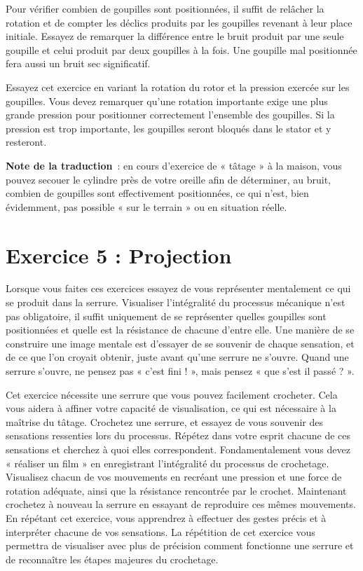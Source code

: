 \documentclass[a4paper,french,11pt,twoside]{report}
\begin{document}
Pour vérifier combien de goupilles sont positionnées, il suffit de relâcher la rotation et de compter les déclics produits par les goupilles revenant à leur place initiale. Essayez de remarquer la différence entre le bruit produit par une seule goupille et celui produit par deux goupilles à la fois. Une goupille mal positionnée fera aussi un bruit sec significatif.

Essayez cet exercice en variant la rotation du rotor et la pression exercée sur les goupilles. Vous devez remarquer qu'une rotation importante exige une plus grande pression pour positionner correctement l'ensemble des goupilles. Si la pression est trop importante, les goupilles seront bloqués dans le stator et y resteront.

\noindent \textbf{Note de la traduction}~: en cours d'exercice de « tâtage » à la maison, vous pouvez secouer le cylindre près de votre oreille afin de déterminer, au bruit, combien de goupilles sont effectivement positionnées, ce qui n'est, bien évidemment, pas possible « sur le terrain » ou en situation réelle.

\section{Exercice 5 : Projection}

Lorsque vous faites ces exercices essayez de vous représenter mentalement ce qui se produit dans la serrure. Visualiser l'intégralité du processus mécanique n'est pas obligatoire, il suffit uniquement de se représenter quelles goupilles sont positionnées et quelle est la résistance de chacune d'entre elle. Une manière de se construire une image mentale est d'essayer de se souvenir de chaque sensation, et de ce que l'on croyait obtenir, juste avant qu'une serrure ne s'ouvre. Quand une serrure s'ouvre, ne pensez pas « c'est fini ! », mais pensez « que s'est il passé ? ».

Cet exercice nécessite une serrure que vous pouvez facilement crocheter. Cela vous aidera à affiner votre capacité de visualisation, ce qui est nécessaire à la maîtrise du tâtage. Crochetez une serrure, et essayez de vous souvenir des sensations ressenties lors du processus. Répétez dans votre esprit chacune de ces sensations et cherchez à quoi elles correspondent. Fondamentalement vous devez « réaliser un film » en enregistrant l'intégralité du processus de crochetage. Visualisez chacun de vos mouvements en recréant une pression et une force de rotation adéquate, ainsi que la résistance rencontrée par le crochet. Maintenant crochetez à nouveau la serrure en essayant de reproduire ces mêmes mouvements.
En répétant cet exercice, vous apprendrez à effectuer des gestes précis et à interpréter chacune de vos sensations. La répétition de cet exercice vous permettra de visualiser avec plus de précision comment fonctionne une serrure et de reconnaître les étapes majeures du crochetage.
\end{document}
